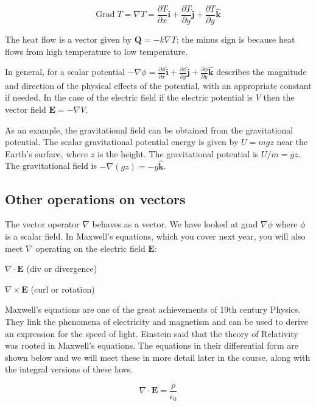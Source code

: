 \documentclass[
  letterpaper,
  DIV=11,
  numbers=noendperiod]{scrreprt}
\begin{document}
\begin{equation}
 \text{Grad} \; T = \nabla T = \frac{\partial T} {\partial x} \hat{\mathbf{i}} + \frac{\partial T}{\partial y} \hat{\mathbf{j}} + \frac{\partial T}{\partial y} \hat{\mathbf{k}}
\end{equation}

The heat flow is a vector given by \(\mathbf{Q} = -k \nabla T\); the
minus sign is because heat flows from high temperature to low
temperature.

In general, for a scalar potential
\(-\nabla \phi = \frac{\partial \phi} {\partial x} \hat{\mathbf{i}} + \frac{\partial \phi}{\partial y} \hat{\mathbf{j}} + \frac{\partial \phi}{\partial y} \hat{\mathbf{k}}\)
describes the magnitude and direction of the physical effects of the
potential, with an appropriate constant if needed. In the case of the
electric field if the electric potential is \(V\) then the vector field
\(\mathbf{E} = -\nabla V\).

As an example, the gravitational field can be obtained from the
gravitational potential. The scalar gravitational potential energy is
given by \(U = mgz\) near the Earth's surface, where \(z\) is the
height. The gravitational potential is \(U/m = gz\). The gravitational
field is \(-\nabla(gz)=-g \hat{\mathbf{k}}\).

\subsection{Other operations on
vectors}\label{other-operations-on-vectors}

The vector operator \(\nabla\) behaves as a vector. We have looked at
grad \(\nabla\phi\) where \(\phi\) is a scalar field. In Maxwell's
equations, which you cover next year, you will also meet \(\nabla\)
operating on the electric field \(\mathbf{E}\):

\(\nabla \cdot \mathbf{E}\) (div or divergence)

\(\nabla \times \mathbf{E}\) (curl or rotation)

Maxwell's equations are one of the great achievements of 19th century
Physics. They link the phenomena of electricity and magnetism and can be
used to derive an expression for the speed of light. Einstein said that
the theory of Relativity was rooted in Maxwell's equations. The
equations in their differential form are shown below and we will meet
these in more detail later in the course, along with the integral
versions of these laws.

\begin{equation}

\nabla \cdot \mathbf{E} = \frac{\rho}{\epsilon_0}
\end{equation}
\end{document}
